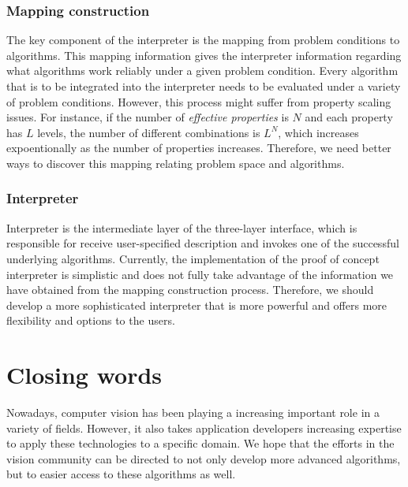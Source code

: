 \subsubsection{Mapping construction}
The key component of the interpreter is the mapping from problem conditions to algorithms. This mapping information gives the interpreter information regarding what algorithms work reliably under a given problem condition. Every algorithm that is to be integrated into the interpreter needs to be evaluated under a variety of problem conditions. However, this process might suffer from property scaling issues. For instance, if the number of \textit{effective properties} is $N$ and each property has $L$ levels, the number of different combinations is $L^N$, which increases expoentionally as the number of properties increases. Therefore, we need better ways to discover this mapping relating problem space and algorithms.

\subsubsection{Interpreter}
Interpreter is the intermediate layer of the three-layer interface, which is responsible for receive user-specified description and invokes one of the successful underlying algorithms. Currently, the implementation of the proof of concept interpreter is simplistic and does not fully take advantage of the information we have obtained from the mapping construction process. Therefore, we should develop a more sophisticated interpreter that is more powerful and offers more flexibility and options to the users.

\section{Closing words}
Nowadays, computer vision has been playing a increasing important role in a variety of fields. However, it also takes application developers increasing expertise to apply these technologies to a specific domain. We hope that the efforts in the vision community can be directed to not only develop more advanced algorithms, but to easier access to these algorithms as well.